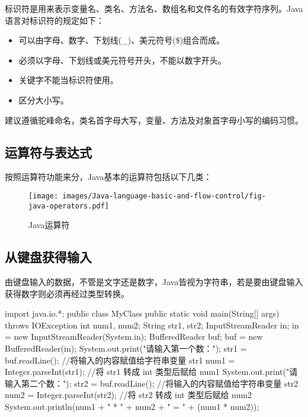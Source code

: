 标识符是用来表示变量名、类名、方法名、数组名和文件名的有效字符序列。Java语言对标识符的规定如下：
  
\begin{itemize}
\item 可以由字母、数字、下划线(\_)、美元符号(\$)组合而成。
\item 必须以字母、下划线或美元符号开头，不能以数字开头。
\item 关键字不能当标识符使用。
\item 区分大小写。
\end{itemize}

建议遵循驼峰命名，类名首字母大写，变量、方法及对象首字母小写的编码习惯。

\subsection{运算符与表达式}

按照运算符功能来分，Java基本的运算符包括以下几类：

\begin{figure}[htb]
\centering
\texttt{[image: images/Java-language-basic-and-flow-control/fig-java-operators.pdf]}
\caption{Java运算符}
\label{fig:java-operators}
\end{figure}
  
\subsection{从键盘获得输入}

由键盘输入的数据，不管是文字还是数字，Java皆视为{\hei\Red 字符串}，若是要由键盘输入获得数字则必须再经过类型转换。


\begin{javaCode}
  import java.io.*;
  public class MyClass {
    public static void main(String[] args) throws IOException {
      int num1, num2;
      String str1, str2;
      InputStreamReader in;
      in = new InputStreamReader(System.in);
      BufferedReader buf;
      buf = new BufferedReader(in);
      System.out.print("请输入第一个数：");
      str1 = buf.readLine();         //将输入的内容赋值给字符串变量 str1
      num1 = Integer.parseInt(str1);   //将 str1 转成 int 类型后赋给 num1
      System.out.print("请输入第二个数：");
      str2 = buf.readLine();         //将输入的内容赋值给字符串变量 str2
      num2 = Integer.parseInt(str2);   //将 str2 转成 int 类型后赋给 num2
      System.out.println(num1 + " * " + num2 + " = " + (num1 * num2));
    }
  }
\end{javaCode}

